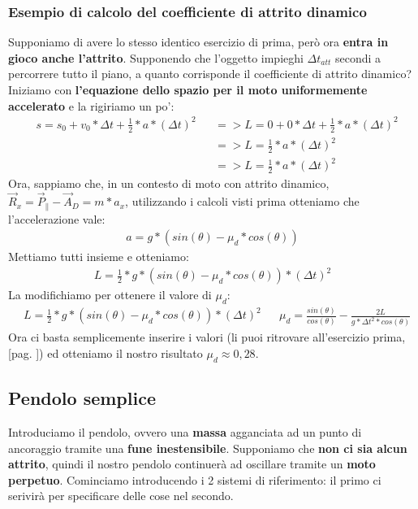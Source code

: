         \subsubsection{Esempio di calcolo del coefficiente di attrito dinamico}
            Supponiamo di avere lo stesso identico esercizio di prima, però ora \textbf{entra in gioco anche l'attrito}. Supponendo che l'oggetto impieghi $\Delta t_{att}$ secondi a percorrere tutto il piano, a quanto corrisponde il coefficiente di attrito dinamico?\\
            Iniziamo con \textbf{l'equazione dello spazio per il moto uniformemente accelerato} e la rigiriamo un po':
            \begin{align*}
                &s = s_0 + v_0*\Delta t + \frac{1}{2}*a*(\Delta t)^2 &&=> L = 0 + 0*\Delta t + \frac{1}{2}*a*(\Delta t)^2\\
                & && => L = \frac{1}{2}*a*(\Delta t)^2\\
                & && => L = \frac{1}{2}*a*(\Delta t)^2
            \end{align*}
            Ora, sappiamo che, in un contesto di moto con attrito dinamico, $\vec{R}_x = \vec{P}_\parallel -\vec{A}_D = m * a_x$, utilizzando i calcoli visti prima otteniamo che l'accelerazione vale:
            \begin{align*}
                a = g*(sin(\theta) - \mu_d*cos(\theta))
            \end{align*}
            Mettiamo tutti insieme e otteniamo:
            \begin{align*}
                L = \frac{1}{2}*g*(sin(\theta) - \mu_d*cos(\theta))*(\Delta t)^2
            \end{align*}
            La modifichiamo per ottenere il valore di $\mu_d$:
            \begin{align*}
                &L = \frac{1}{2}*g*(sin(\theta) - \mu_d*cos(\theta))*(\Delta t)^2 && \mu_d =\frac{sin(\theta)}{cos(\theta)}-\frac{2L}{g*\Delta t^2*cos(\theta)}
            \end{align*}
            Ora ci basta semplicemente inserire i valori (li puoi ritrovare all'esercizio prima, [pag. \pageref{EsercizioConAttrito}]) ed otteniamo il nostro risultato $\mu_d \approx 0,28$.

    \subsection{Pendolo semplice}
        Introduciamo il pendolo, ovvero una \textbf{massa} agganciata ad un punto di ancoraggio tramite una \textbf{fune inestensibile}. Supponiamo che \textbf{non ci sia alcun attrito}, quindi il nostro pendolo continuerà ad oscillare tramite un \textbf{moto perpetuo}. Cominciamo introducendo i 2 sistemi di riferimento: il primo ci serivirà per specificare delle cose nel secondo.

